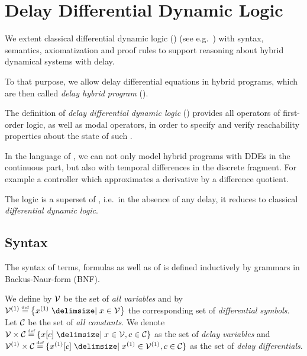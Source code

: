 \chapter{Delay Differential Dynamic Logic}
\label{ch:delay-differential-dynamic-logic}

We extent classical differential dynamic logic (\dL) (see e.g.~\cite{Platzer12LogicsDynSys}) with syntax, semantics, axiomatization and proof rules to support reasoning about hybrid dynamical systems with delay.

To that purpose, we allow delay differential equations in hybrid programs, which are then called \emph{delay hybrid program} (\dHP).

The definition of \emph{delay differential dynamic logic} (\ddL) provides all operators of first-order logic, as well as modal operators, in order to specify and verify reachability properties about the state of such \dHPs.

In the language of \ddL, we can not only model hybrid programs with DDEs in the continuous part, but also with temporal differences in the discrete fragment.
For example a controller which approximates a derivative by a difference quotient.

The logic \ddL is a superset of \dL, i.e.\ in the absence of any delay, it reduces to classical \emph{differential dynamic logic}.






\section{Syntax}
    \label{sec:syntax}

    The syntax of \ddL terms, formulas as well as of \dHPs is defined inductively by grammars in Backus-Naur-form (BNF).

    We define by $\mathcal{V}$ be the set of \emph{all variables} and by $\diffvars\defeq\set{\D{x} \with x\in\allvars}$ the corresponding set of \emph{differential symbols}.
    Let $\mathcal{C}_{}$ be the set of \emph{all constants}. We denote $\delayvars\defeq\{\x[c] \with x\in\allvars, c\in\constants\}$ as the set of \emph{delay variables} and $\delaydiffvars\defeq\{\Dx[c] \with \D{x}\in\diffvars, c\in\constants\}$ as the set of \emph{delay differentials}.

